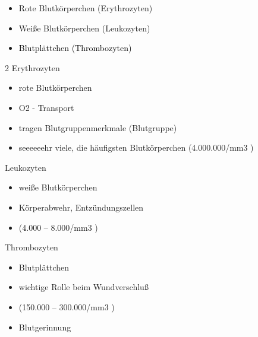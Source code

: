 \documentclass{article}
\newcommand\gZ[1]{\textcolor[rgb]{0.5019608,0.5019608,0.5019608}{#1}}
\begin{document}
\begin{itemize}
\item {\color{red}
Rote Blutk\"orperchen (Erythrozyten)}

\item {\mdseries
Wei{\ss}e Blutk\"orperchen (Leukozyten)}

\item {\mdseries
\gZ{\textcolor{black}{Blutpl\"attchen (Thrombozyten)}}}

\end{itemize}
\begin{multicols}{2}
{\mdseries\color{black}
Erythrozyten }

\begin{itemize}
\item {\color{red}
rote Blutk\"orperchen}

\item {\mdseries
O2 - Transport}

\item {\mdseries
tragen Blutgruppenmerkmale (Blutgruppe)}

\item {\mdseries
seeeeeehr viele, die h\"aufigsten Blutk\"orperchen
\gZ{(4.000.000/mm3 )}}

\end{itemize}
{\mdseries\color{black}
Leukozyten }

\begin{itemize}
\item {\mdseries
wei{\ss}e Blutk\"orperchen }

\item {\mdseries
K\"orperabwehr, Entz\"undungszellen}

\item {\mdseries
\gZ{(4.000 -- 8.000/mm3 )}}

\end{itemize}
{\mdseries\color{black}
Thrombozyten }

\begin{itemize}
\item {\mdseries
{}Blutpl\"attchen}

\item {\mdseries
wichtige Rolle beim Wundverschlu{\ss}}

\item {\mdseries
\gZ{(150.000 -- 300.000/mm3 )}}

\item {\mdseries
Blutgerinnung}


\end{itemize}
\end{multicols}
\end{document}
